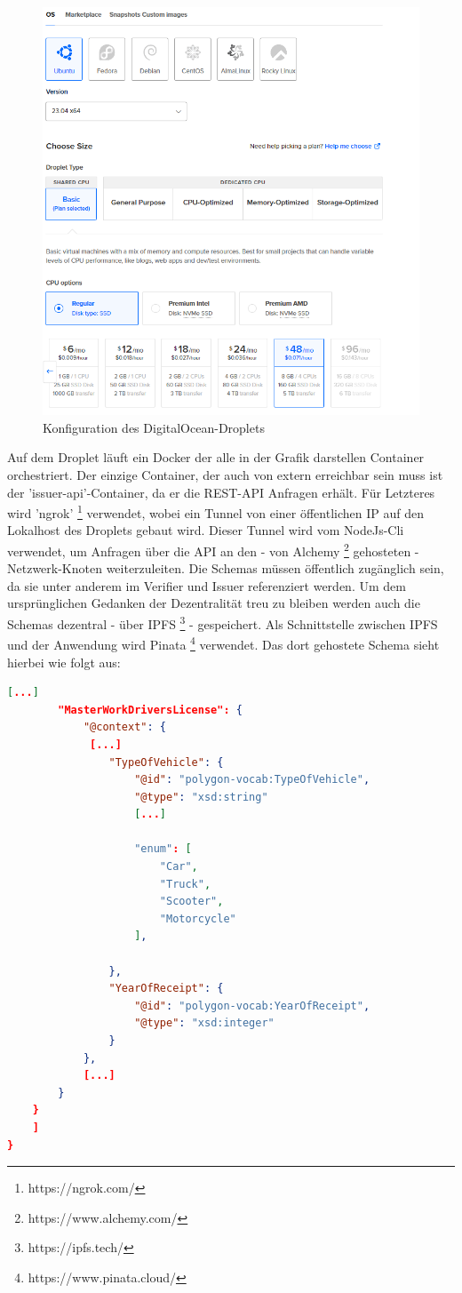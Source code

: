 \begin{figure}[h]
	\centering
	\includegraphics[scale=0.4]{media/config}
	\caption{Konfiguration des DigitalOcean-Droplets}
	\label{fig:meine-grafik}
\end{figure}
Auf dem Droplet läuft ein Docker der alle in der Grafik darstellen Container orchestriert. Der einzige Container, der auch von extern erreichbar sein muss ist der 'issuer-api'-Container, da er die REST-API Anfragen erhält. Für Letzteres wird 'ngrok' \footnote{https://ngrok.com/} verwendet, wobei ein Tunnel von einer öffentlichen IP auf den Lokalhost des Droplets gebaut wird. Dieser Tunnel wird vom NodeJs-Cli verwendet, um Anfragen über die API an den - von Alchemy \footnote{https://www.alchemy.com/} gehosteten - Netzwerk-Knoten weiterzuleiten. Die Schemas müssen öffentlich zugänglich sein, da sie unter anderem im Verifier und Issuer referenziert werden. Um dem ursprünglichen Gedanken der Dezentralität treu zu bleiben werden auch die Schemas dezentral - über IPFS \footnote{https://ipfs.tech/} - gespeichert. Als Schnittstelle zwischen IPFS und der Anwendung wird Pinata \footnote{https://www.pinata.cloud/} verwendet. Das dort gehostete Schema sieht hierbei wie folgt aus:
\begin{lstlisting}[language=json,firstnumber=1]	
		[...]
		"MasterWorkDriversLicense": {
			"@context": {
			 [...]
				"TypeOfVehicle": {
					"@id": "polygon-vocab:TypeOfVehicle",
					"@type": "xsd:string"
					[...]
					
					"enum": [
						"Car",
						"Truck",
						"Scooter",
						"Motorcycle"
					],
					
				},
				"YearOfReceipt": {
					"@id": "polygon-vocab:YearOfReceipt",
					"@type": "xsd:integer"
				}
			},
			[...]
		}
	}
	]
}
\end{lstlisting}

